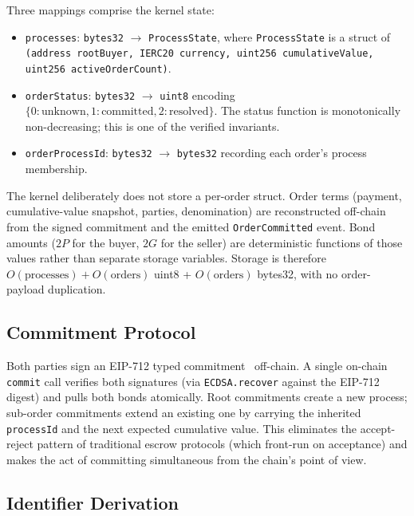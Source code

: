 \documentclass[11pt,a4paper]{article}
\theoremstyle{definition}
\theoremstyle{remark}
\newcommand{\pay}{P}
\newcommand{\cumval}{G}
\begin{document}
Three mappings comprise the kernel state:
\begin{itemize}
  \item \texttt{processes}: \texttt{bytes32} $\to$
    \texttt{ProcessState}, where \texttt{ProcessState} is a struct of
    \texttt{(address rootBuyer, IERC20 currency, uint256
    cumulativeValue, uint256 activeOrderCount)}.
  \item \texttt{orderStatus}: \texttt{bytes32} $\to$ \texttt{uint8}
    encoding $\{0:\text{unknown}, 1:\text{committed},
    2:\text{resolved}\}$. The status function is monotonically
    non-decreasing; this is one of the verified invariants.
  \item \texttt{orderProcessId}: \texttt{bytes32} $\to$
    \texttt{bytes32} recording each order's process membership.
\end{itemize}

The kernel deliberately does not store a per-order struct. Order
terms (payment, cumulative-value snapshot, parties, denomination) are
reconstructed off-chain from the signed commitment and the emitted
\texttt{OrderCommitted} event. Bond amounts ($2\pay$ for the buyer,
$2\cumval$ for the seller) are deterministic functions of those
values rather than separate storage variables. Storage is therefore
$O(\text{processes}) + O(\text{orders})$ uint8 + $O(\text{orders})$
bytes32, with no order-payload duplication.

\subsection{Commitment Protocol}

Both parties sign an EIP-712 typed commitment~\citep{eip712}
off-chain. A single on-chain \texttt{commit} call verifies both
signatures (via \texttt{ECDSA.recover} against the EIP-712 digest)
and pulls both bonds atomically. Root commitments create a new
process; sub-order commitments extend an existing one by carrying
the inherited \texttt{processId} and the next expected cumulative
value. This eliminates the accept-reject pattern of traditional
escrow protocols (which front-run on acceptance) and makes the act
of committing simultaneous from the chain's point of view.

\subsection{Identifier Derivation}
\end{document}
